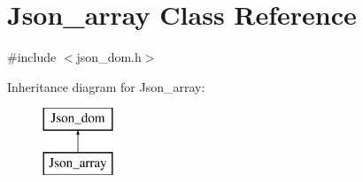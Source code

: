 \hypertarget{classJson__array}{}\section{Json\+\_\+array Class Reference}
\label{classJson__array}


{\ttfamily \#include $<$json\+\_\+dom.\+h$>$}

Inheritance diagram for Json\+\_\+array\+:\begin{figure}[H]
\begin{center}
\leavevmode
\includegraphics[height=2.000000cm]{classJson__array}
\end{center}
\end{figure}
